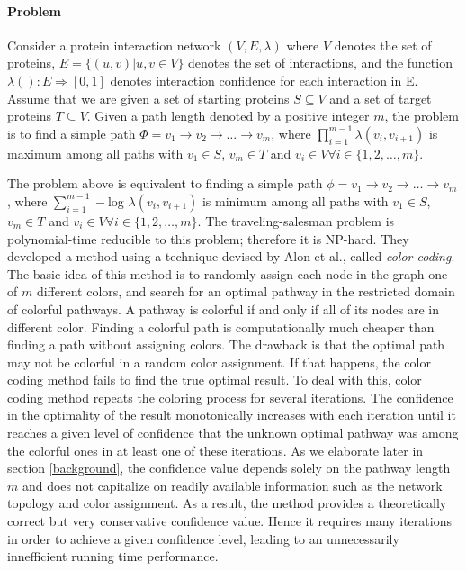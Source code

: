 \documentclass{ws-procs11x85}
\begin{document}
\paragraph{Problem} Consider a protein interaction network $(V, E, \lambda)$ where
$V$ denotes the set of proteins, $E = \{(u, v) | u,v \in V\}$ denotes the set of
interactions, and the function $\lambda(): E \Rightarrow [0, 1]$  denotes interaction
confidence for each interaction in E. Assume that we are given a set of starting
proteins $S \subseteq V$ and a set of target proteins $T \subseteq V$. Given a
path length denoted by a positive integer $m$, the problem is to find a simple
path $\Phi = v_1 \rightarrow v_2 \rightarrow \ldots \rightarrow v_m$, where
$\prod_{i=1}^{m-1} \lambda(v_i, v_{i+1})$ is maximum among all paths with $v_1 \in
S$, $v_m \in T$ and $v_i \in V \forall i \in \{1, 2, \ldots , m\}$.

The problem above is equivalent to finding a simple path $\phi = v_1
\rightarrow v_2 \rightarrow \ldots \rightarrow v_m$, where
$\sum_{i=1}^{m-1} -$log $\lambda(v_i, v_{i+1})$ is minimum among all
paths with $v_1 \in S$, $v_m \in T$ and $v_i \in V \forall i \in \{1,
2, \ldots , m\}$. The traveling-salesman problem is polynomial-time
reducible to this problem\cite{scott}; therefore it is NP-hard. They
developed a method using a technique devised by Alon et
al.\cite{alon}, called \textit{color-coding}. The basic idea of this
method is to randomly assign each node in the graph one of $m$
different colors, and search for an optimal pathway in the restricted
domain of colorful pathways. A pathway is colorful if and only if all
of its nodes are in different color. Finding a colorful path is
computationally much cheaper than finding a path without assigning
colors. The drawback is that the optimal path may not be colorful in a
random color assignment. If that happens, the color coding method
fails to find the true optimal result. To deal with this, color coding
method repeats the coloring process for several iterations.  The
confidence in the optimality of the result monotonically increases
with each iteration until it reaches a given level of confidence that
the unknown optimal pathway was among the colorful ones in at least
one of these iterations. As we elaborate later in section
\ref{background}, the confidence value depends solely on the pathway
length $m$ and does not capitalize on readily available information
such as the network topology and color assignment. As a result, the
method provides a theoretically correct but very conservative
confidence value.  Hence it requires many iterations in order to
achieve a given confidence level, leading to an unnecessarily
innefficient running time performance.
\end{document}
